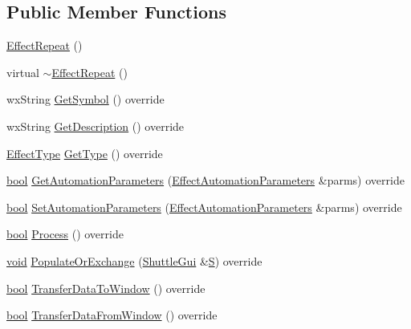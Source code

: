 \subsection*{Public Member Functions}
\begin{DoxyCompactItemize}
\item 
\hyperlink{class_effect_repeat_aae58ffa94beea1611405b99946678898}{Effect\+Repeat} ()
\item 
virtual \hyperlink{class_effect_repeat_a87e28c184597a0ac06126af63f509024}{$\sim$\+Effect\+Repeat} ()
\item 
wx\+String \hyperlink{class_effect_repeat_a53d26c564beb4e30fe514223956889ee}{Get\+Symbol} () override
\item 
wx\+String \hyperlink{class_effect_repeat_a1c9019c41b5628eeea03c0073cf17723}{Get\+Description} () override
\item 
\hyperlink{_effect_interface_8h_a4809a7bb3fd1a421902a667cc1405d43}{Effect\+Type} \hyperlink{class_effect_repeat_a32267186f74a00574d4310fc037f7aba}{Get\+Type} () override
\item 
\hyperlink{mac_2config_2i386_2lib-src_2libsoxr_2soxr-config_8h_abb452686968e48b67397da5f97445f5b}{bool} \hyperlink{class_effect_repeat_ae813e007206753cdef5e7cfa61ef988d}{Get\+Automation\+Parameters} (\hyperlink{class_effect_automation_parameters}{Effect\+Automation\+Parameters} \&parms) override
\item 
\hyperlink{mac_2config_2i386_2lib-src_2libsoxr_2soxr-config_8h_abb452686968e48b67397da5f97445f5b}{bool} \hyperlink{class_effect_repeat_aadff89e8a25e7f4580358275e1158cd5}{Set\+Automation\+Parameters} (\hyperlink{class_effect_automation_parameters}{Effect\+Automation\+Parameters} \&parms) override
\item 
\hyperlink{mac_2config_2i386_2lib-src_2libsoxr_2soxr-config_8h_abb452686968e48b67397da5f97445f5b}{bool} \hyperlink{class_effect_repeat_a1b49f1da0c04a57de05a105a3dbd45fd}{Process} () override
\item 
\hyperlink{sound_8c_ae35f5844602719cf66324f4de2a658b3}{void} \hyperlink{class_effect_repeat_ae22b71dd3d9a20e097f32c635324c336}{Populate\+Or\+Exchange} (\hyperlink{class_shuttle_gui}{Shuttle\+Gui} \&\hyperlink{xlftab_8c_af933676109efed7ab34cea71d748a517}{S}) override
\item 
\hyperlink{mac_2config_2i386_2lib-src_2libsoxr_2soxr-config_8h_abb452686968e48b67397da5f97445f5b}{bool} \hyperlink{class_effect_repeat_ae506bfa2beb02661df72803cc8b607ce}{Transfer\+Data\+To\+Window} () override
\item 
\hyperlink{mac_2config_2i386_2lib-src_2libsoxr_2soxr-config_8h_abb452686968e48b67397da5f97445f5b}{bool} \hyperlink{class_effect_repeat_a74cebe8d95727579f91ec9ecd42f67e4}{Transfer\+Data\+From\+Window} () override
\end{DoxyCompactItemize}
